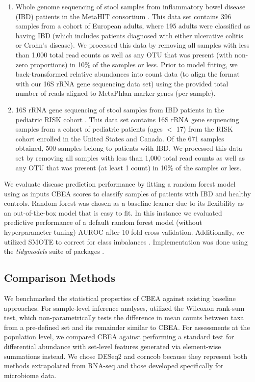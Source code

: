 \documentclass[10pt,letterpaper]{article}
\begin{document}
\begin{enumerate}
\item Whole genome sequencing of stool samples from inflammatory bowel disease (IBD) patients in the MetaHIT consortium \cite{nielsen2014}. This data set contains 396 samples from a cohort of European adults, where 195 adults were classified as having IBD (which includes patients diagnosed with either ulcerative colitis or Crohn's disease). We processed this data by removing all samples with less than 1,000 total read counts as well as any OTU that was present (with non-zero proportions) in 10\% of the samples or less. Prior to model fitting, we back-transformed relative abundances into count data (to align the format with our 16S rRNA gene sequencing data set) using the provided total number of reads aligned to MetaPhlan marker genes (per sample).   

\item 16S rRNA gene sequencing of stool samples from IBD patients in the pediatric RISK cohort \cite{gevers2014}. This data set contains 16S rRNA gene sequencing samples from a cohort of pediatric patients (ages $<$ 17) from the RISK cohort enrolled in the United States and Canada. Of the 671 samples obtained, 500 samples belong to patients with IBD. We processed this data set by removing all samples with less than 1,000 total read counts as well as any OTU that was present (at least 1 count) in 10\% of the samples or less.   
\end{enumerate}

We evaluate disease prediction performance by fitting a random forest model \cite{breiman2001} using as inputs CBEA scores to classify samples of patients with IBD and healthy controls. Random forest was chosen as a baseline learner due to its flexibility as an out-of-the-box model that is easy to fit. In this instance we evaluated predictive performance of a default random forest model (without hyperparameter tuning) AUROC after 10-fold cross validation. Additionally, we utilized SMOTE to correct for class imbalances \cite{chawla2002}. Implementation was done using the \emph{tidymodels} suite of packages \cite{kuhn2020}.   

\subsection*{Comparison Methods} 
We benchmarked the statistical properties of CBEA against existing baseline approaches. For sample-level inference analyses, utilized the Wilcoxon rank-sum test, which non-parametrically tests the difference in mean counts between taxa from a pre-defined set and its remainder similar to CBEA. For assessments at the population level, we compared CBEA against performing a standard test for differential abundance with set-level features generated via element-wise summations instead. We chose DESeq2 \cite{love2014} and corncob \cite{martin2020} because they represent both methods extrapolated from RNA-seq \cite{mcmurdie2014} and those developed specifically for microbiome data.   
\end{document}
